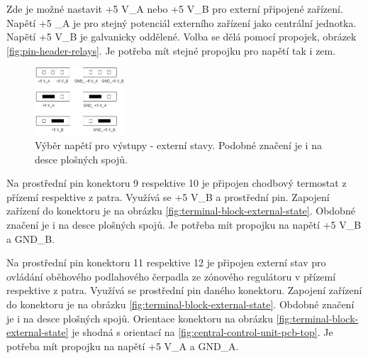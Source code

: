 \begin{Czech}
Zde je možné nastavit +5 V\_A nebo +5 V\_B pro externí připojené zařízení. Napětí +5 \_A je pro stejný potenciál externího zařízení jako centrální jednotka. Napětí +5 V\_B je galvanicky oddělené. Volba se dělá pomocí propojek, obrázek \ref{fig:pin-header-relays}. Je potřeba mít stejné propojku pro napětí tak i zem.
\end{Czech}

\begin{Czech}
\begin{figure}[H]
    \centering
    \includegraphics[width=0.3\textwidth]{pictures/all/hardware/pin-header-external-states.png}
    \caption{Výběr napětí pro výstupy - externí stavy. Podobné značení je i na desce plošných spojů.}
    \label{fig:pin-header-external-states}
\end{figure}
\end{Czech}

\begin{Czech}
\end{Czech}

\begin{Czech}
Na prostřední pin konektoru 9 respektive 10 je připojen chodbový termostat z přízemí respektive z patra. Využívá se +5 V\_B a prostřední pin. Zapojení zařízení do konektoru je na obrázku \ref{fig:terminal-block-external-state}. Obdobné značení je i na desce plošných spojů. Je potřeba mít propojku na napětí +5 V\_B a  GND\_B.
\end{Czech}

\begin{Czech}
\end{Czech}

\begin{Czech}
Na prostřední pin konektoru 11 respektive 12 je připojen externí stav pro ovládání oběhového podlahového čerpadla ze zónového regulátoru v přízemí respektive z patra. Využívá se prostřední pin daného konektoru. Zapojení zařízení do konektoru je na obrázku \ref{fig:terminal-block-external-state}. Obdobné značení je i na desce plošných spojů. Orientace konektoru na obrázku \ref{fig:terminal-block-external-state} je shodná s orientací na \ref{fig:central-control-unit-pcb-top}. Je potřeba mít propojku na napětí +5 V\_A a  GND\_A.
\end{Czech}

